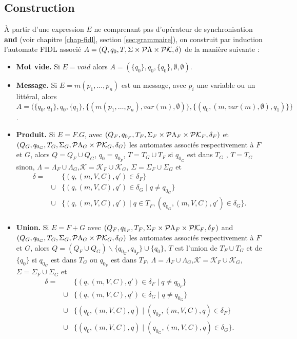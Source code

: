 \subsection{Construction}
\label{section-construction}
\`A partir d'une expression $E$ ne comprenant pas
d'op\'erateur de synchronisation \textbf{and} (voir chapitre
\ref{chap-fidl}, section \ref{sec:grammaire}), on construit par
induction l'automate \textsf{FIDL}
associ\'e  $A = (Q,q_0,T,\Sigma\times{}{\cal P}\Lambda\times{}{\cal P}\mathcal{K},
\delta)$ de la mani\`ere suivante :

\begin{itemize}
  \item \textbf{Mot vide.} Si $E = void$ alors $A= (\{q_0\}, q_0,\{q_0\},\emptyset,\emptyset)$.
  \item \textbf{Message.} Si $E = m(p_1,\dots,p_n)$  est un  message, avec $p_i$ une
    variable ou un litt\'eral, alors
    $A=(\{q_0,q_1\}, q_0, \{q_1\},  \{(m(p_1,\dots,p_n),var(m),\emptyset)\},
    \{(q_0, (m, var(m),\emptyset),q_1)\}\}$.
  \item \textbf{Produit.} Si $E = F.G$, avec $(Q_F,q_{0_F},T_F,
  \Sigma_F  \times{}{\cal P}\Lambda_F \times{}{\cal P}\mathcal{K}_F,\delta_F)$ et $(Q_G,q_{0_G},
  T_G,\Sigma_G,
  {\cal P}\Lambda_G \times{}{\cal P}\mathcal{K}_G,\delta_G)$ les automates associ\'es  respectivement \`a $F$ et  $G$, alors $Q = Q_F \cup Q_G$, $q_0 = q_{0_F}$, $T = T_G \cup T_F$
   si $q_{0_G}$ est dans $T_G$ , $T = T_G$ sinon,
  $\Lambda=\Lambda_F\cup \Lambda_G$,$\mathcal{K}=\mathcal{K}_F\cup \mathcal{K}_G$, $\Sigma = \Sigma_F \cup
    \Sigma_G$  et
    \[
    \begin{array}{rcl}
        \delta =&&  \{(q,(m,V,C),q') \in \delta_F  \}  \\
        &\cup&\{(q,(m,V, C),q') \in \delta_G \mid  q\neq q_{0_G}\}\\
        &\cup&\{(q,(m,V,C),q')\mid  q\in T_F, (q_{0_G},(m,V,C),q')
        \in \delta_G\}. \\
    \end{array}
    \]
  \item \textbf{Union.} Si $E = F + G$ avec $(Q_F,q_{0_F},T_F,
  \Sigma_F  \times{}{\cal P}\Lambda_F \times{}{\cal P}\mathcal{K}_F,\delta_F)$ and
  $(Q_G,q_{0_G}, T_G,\Sigma_G,
  {\cal P}\Lambda_G \times{}{\cal P}\mathcal{K}_G,\delta_G)$ les automates associ\'es
  respectivement \`a $F$ et  $G$, alors
   $Q = (Q_F \cup Q_G) \backslash \{q_{0_G},q_{0_F}\} \cup \{q_0\}$,
   $T$ est l'union de   $T_F \cup T_G$ et de  $ \{q_0\}$ si
                $q_{0_G}$ est dans  $T_G$ ou  $q_{0_F}$ est dans $T_F$,
         $\Lambda=\Lambda_F\cup \Lambda_G$,$\mathcal{K}=\mathcal{K}_F\cup \mathcal{K}_G$,$\Sigma = \Sigma_F \cup \Sigma_G$ et
    \[
    \begin{array}{rcl}
        \delta =&&  \{(q,(m,V,C),q') \in \delta_F \mid q\neq q_{0_F} \}\\
        &\cup&\{(q,(m,V,C),q') \in \delta_G \mid q\neq q_{0_G}\}\\
        &\cup&\{(q_0,(m,V,C),q)\mid (q_{0_F},(m,V,C),q) \in \delta_F\}\\
        &\cup&\{(q_0,(m,V,C),q)\mid (q_{0_G},(m,V,C),q) \in \delta_G \}.
    \end{array}
    \]


\end{itemize}
